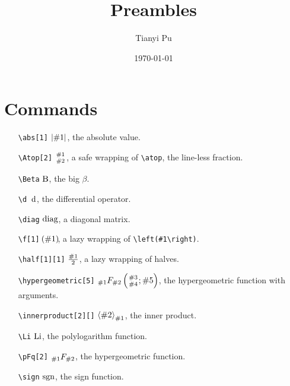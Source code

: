 \documentclass{article}
\title{Preambles}
\author{Tianyi Pu}
\date{\today}
\begin{document}
\maketitle

\section{Commands}
\begin{itemize}
    \item[\texttt{\textbackslash abs[1]}] $\abs{\#1}$, the absolute value.
    \item[\texttt{\textbackslash Atop[2]}] $\Atop{\#1}{\#2}$, a safe wrapping of \texttt{\textbackslash atop}, the line-less fraction.
    \item[\texttt{\textbackslash Beta}] $\Beta$, the big $\beta$.
    \item[\texttt{\textbackslash d}] $\d$, the differential operator.
    \item[\texttt{\textbackslash diag}] $\diag$, a diagonal matrix.
    \item[\texttt{\textbackslash f[1]}] $\f{\#1}$, a lazy wrapping of \texttt{\textbackslash left(\#1\textbackslash right)}.
    \item[\texttt{\textbackslash half[1][1]}] $\half[\#1]$, a lazy wrapping of halves.
    \item[\texttt{\textbackslash hypergeometric[5]}] $\hypergeometric{\#1}{\#2}{\#3}{\#4}{\#5}$, the hypergeometric function with arguments.
    \item[\texttt{\textbackslash innerproduct[2][]}] $\innerproduct[\#1]{\#2}$, the inner product.
    \item[\texttt{\textbackslash Li}] $\Li$, the polylogarithm function.
    \item[\texttt{\textbackslash pFq[2]}] $\pFq{\#1}{\#2}$, the hypergeometric function.
    \item[\texttt{\textbackslash sign}] $\sign$, the sign function.
\end{itemize}

\nocite{*}


\end{document}
